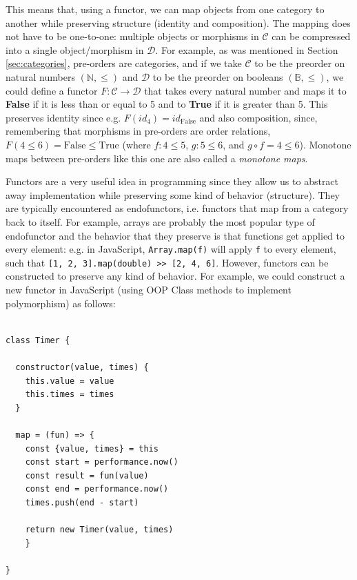 \documentclass[12pt,a4paper]{article}
\begin{document}
This means that, using a functor, we can map objects from one category to another while preserving structure (identity and composition). The mapping does not have to be one-to-one: multiple objects or morphisms in $\mathcal{C}$ can be compressed into a single object/morphism in $\mathcal{D}$. For example, as was mentioned in Section \ref{sec:categories}, pre-orders are categories, and if we take $\mathcal{C}$ to be the preorder on natural numbers $(\mathbb{N}, \leq)$ and $\mathcal{D}$ to be the preorder on booleans $(\mathbb{B}, \leq)$, we could define a functor $F: \mathcal{C} \to \mathcal{D}$ that takes every natural number and maps it to \textbf{False} if it is less than or equal to 5 and to \textbf{True} if it is greater than 5. This preserves identity since e.g. $F(id_4) = id_{\text{False}}$ and also composition, since, remembering that morphisms in pre-orders are order relations, $F(4 \leq 6) = \text{False} \leq \text{True}$ (where $f: 4 \leq 5$, $g: 5 \leq 6$, and $g \circ f = 4 \leq 6$). Monotone maps between pre-orders like this one are also called a \textit{monotone maps}.

Functors are a very useful idea in programming since they allow us to abstract away implementation while preserving some kind of behavior (structure). They are typically encountered as endofunctors, i.e. functors that map from a category back to itself. For example, arrays are probably the most popular type of endofunctor and the behavior that they preserve is that functions get applied to every element: e.g. in JavaScript, \texttt{Array.map(f)} will apply \texttt{f} to every element, such that \texttt{[1, 2, 3].map(double) >> [2, 4, 6]}. However, functors can be constructed to preserve any kind of behavior. For example, we could construct a new functor in JavaScript (using OOP Class methods to implement polymorphism) as follows:      

\begin{verbatim}

class Timer {
  
  constructor(value, times) {
    this.value = value
    this.times = times
  }
  
  map = (fun) => {
    const {value, times} = this
    const start = performance.now()
    const result = fun(value)
    const end = performance.now()
    times.push(end - start)
    
    return new Timer(value, times)
    }
    
}

\end{verbatim}
\end{document}
